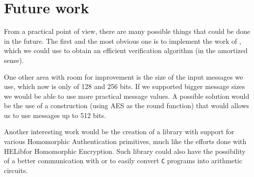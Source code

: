 \section{Future work}
From a practical point of view, there are many possible things that could be
done in the future. The first and the most obvious one is to implement the work
of \textcite{backes:fiore:reischuk:2013}, which we could use to obtain an
efficient verification algorithm (in the amortized sense).

One other area with room for improvement is the size of the input messages we
use, which now is only of 128 and 256 bits. If we supported bigger message
sizes we would be able to use more practical message values. A possible
solution would be the use of a \textcite{lubyrackoff} construction (using AES
as the round function) that would allows us to use messages up to 512 bits.

Another interesting work would be the creation of a library with support for
various Homomorphic Authentication primitives, much like the efforts done with
HELib\footnotemark for Homomorphic Encryption. Such library could also have the
possibility of a better communication with
 or  to easily
convert \texttt{C} programs into arithmetic circuits.
